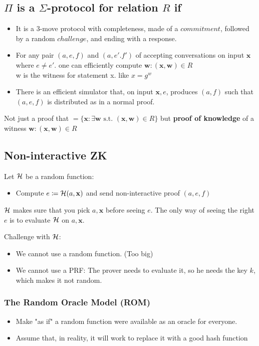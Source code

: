 \documentclass[12pt]{article}
\begin{document}
\subsection{$\Pi$ is a $\Sigma$-protocol for relation $R$ if}
\begin{itemize}
\item It is a 3-move protocol with completeness, made of a $commitment$, followed by a random $challenge$, and ending with a response.
\item For any pair $(a,e,f)$ and $(a,e'.f')$ of accepting conversations on input $\mathbf{x}$ where $e \neq e'$. one can efficiently compute $\mathbf{w}:(\mathbf{x},\mathbf{w}) \in R$\\
w is the witness for statement x. like $x=g^w$
\item There is an efficient simulator that, on input $\mathbf{x},e$, produces $(a,f)$ such that $(a,e,f)$ is distributed as in a normal proof.
\end{itemize}
Not just a proof that \xinL $=\{\mathbf{x} : \exists \mathbf{w} \text{ s.t. } (\mathbf{x},\mathbf{w}) \in R \}$ but \textbf{proof of knowledge} of a witness $\mathbf{w} : (\mathbf{x},\mathbf{w}) \in R$


\subsection{Non-interactive ZK}
Let $\mathcal{H}$ be a random function:
\begin{itemize}
	\item Compute $e \coloneqq \mathcal{H}(a,\mathbf{x})$ and send non-interactive proof $(a,e,f)$
\end{itemize}

$\mathcal{H}$ makes sure that you pick $a,\mathbf{x}$ before seeing $e$. The only way of seeing the right $e$ is to evaluate $\mathcal{H}$ on $a,\mathbf{x}$.

Challenge with $\mathcal{H}$:
\begin{itemize}
\item We cannot use a random function. (Too big)
\item We cannot use a PRF: The prover needs to evaluate it, so he needs the key $k$, which makes it not random.
\end{itemize}


\subsubsection{The Random Oracle Model (ROM)}
\begin{itemize}
	\item Make "as if" a random function were available as an oracle for everyone.
	\item Assume that, in reality, it will work to replace it with a good hash function
\end{itemize}
\end{document}

